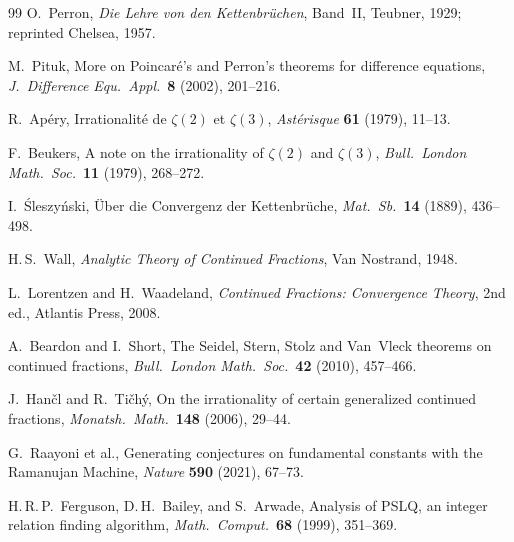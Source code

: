 \documentclass[11pt,a4paper]{article}
\theoremstyle{definition}
\theoremstyle{remark}
\begin{document}
\begin{thebibliography}{99}
  O.~Perron, \emph{Die Lehre von den Kettenbr\"uchen}, Band~II,
  Teubner, 1929; reprinted Chelsea, 1957.

  M.~Pituk, More on Poincar\'e's and Perron's theorems for
  difference equations,
  \emph{J.\ Difference Equ.\ Appl.}\ \textbf{8} (2002), 201--216.

  R.~Ap\'ery, Irrationalit\'e de $\zeta(2)$ et $\zeta(3)$,
  \emph{Ast\'erisque} \textbf{61} (1979), 11--13.

  F.~Beukers, A note on the irrationality of $\zeta(2)$ and $\zeta(3)$,
  \emph{Bull.\ London Math.\ Soc.}\ \textbf{11} (1979), 268--272.

  I.~\'{S}leszy\'{n}ski, \"Uber die Convergenz der Kettenbr\"uche,
  \emph{Mat.\ Sb.}\ \textbf{14} (1889), 436--498.

  H.\,S.~Wall, \emph{Analytic Theory of Continued Fractions},
  Van Nostrand, 1948.

  L.~Lorentzen and H.~Waadeland,
  \emph{Continued Fractions: Convergence Theory}, 2nd ed.,
  Atlantis Press, 2008.

  A.~Beardon and I.~Short, The Seidel, Stern, Stolz and Van~Vleck
  theorems on continued fractions,
  \emph{Bull.\ London Math.\ Soc.}\ \textbf{42} (2010), 457--466.

  J.~Han\v{c}l and R.~Ti\v{c}h\'{y},
  On the irrationality of certain generalized continued fractions,
  \emph{Monatsh.\ Math.}\ \textbf{148} (2006), 29--44.

  G.~Raayoni et al., Generating conjectures on fundamental constants
  with the Ramanujan Machine, \emph{Nature} \textbf{590} (2021), 67--73.

  H.\,R.\,P.~Ferguson, D.\,H.~Bailey, and S.~Arwade,
  Analysis of PSLQ, an integer relation finding algorithm,
  \emph{Math.\ Comput.}\ \textbf{68} (1999), 351--369.
\end{thebibliography}
\end{document}
